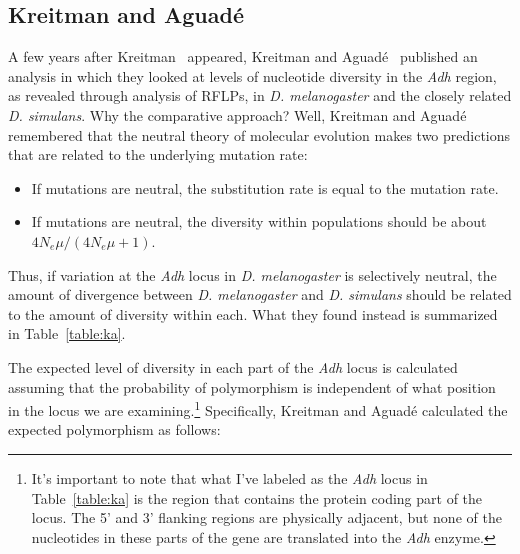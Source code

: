 \documentclass[12pt]{article}
\begin{document}
\subsection*{Kreitman and Aguad{\'e}}

A few years after Kreitman~\cite{Kreitman83} appeared, Kreitman and
Aguad{\'e}~\cite{Kreitman-Aguade86} published an analysis in which
they looked at levels of nucleotide diversity in the {\it Adh\/}
region, as revealed through analysis of RFLPs, in {\it
  D. melanogaster\/} and the closely related {\it D. simulans}. Why
the comparative approach? Well, Kreitman and Aguad{\'e} remembered
that the neutral theory of molecular evolution makes two predictions
that are related to the underlying mutation rate:

\begin{itemize}

\item If mutations are neutral, the substitution rate is equal to the
  mutation rate.

\item If mutations are neutral, the diversity within populations
  should be about $4N_e\mu/(4N_e\mu + 1)$.

\end{itemize}

\noindent Thus, if variation at the {\it Adh\/} locus in {\it
  D. melanogaster\/} is selectively neutral, the amount of divergence
between {\it D. melanogaster\/} and {\it D. simulans\/} should be
related to the amount of diversity within each. What they found
instead is summarized in Table~\ref{table:ka}.

The expected level of diversity in each part of the {\it Adh\/} locus
is calculated assuming that the probability of polymorphism is
independent of what position in the locus we are
examining.\footnote{It's important to note that what I've labeled as
  the {\it Adh\/} locus in Table~\ref{table:ka} is the region that
  contains the protein coding part of the locus. The 5' and 3'
  flanking regions are physically adjacent, but none of the
  nucleotides in these parts of the gene are translated into the {\it
    Adh\/} enzyme.} Specifically, Kreitman and Aguad{\'e} calculated
the expected polymorphism as follows:
\end{document}
